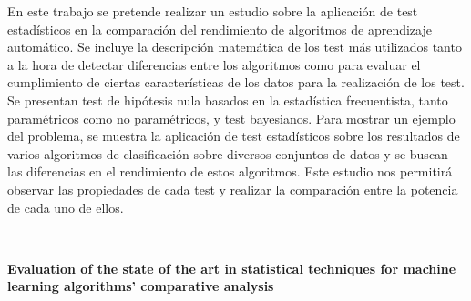 \chapter*{}





\cleardoublepage
\thispagestyle{empty}

\begin{center}
{\large\bfseries \myTitle }\\
\end{center}
\begin{center}	
	\myName \\
\end{center}


\vspace{0.7cm}
\\

	En este trabajo se pretende realizar un estudio sobre
	la aplicación de test estadísticos en la comparación
	del rendimiento de algoritmos de aprendizaje automático.
	Se incluye la descripción matemática de los test más
	utilizados tanto a la hora de detectar diferencias 
	entre los algoritmos como para evaluar el cumplimiento
	de ciertas características de los datos para la
	realización de los test. Se presentan test de 
	hipótesis nula basados en la estadística frecuentista,
	tanto paramétricos como no paramétricos, y test
	bayesianos. Para mostrar un ejemplo del problema, se 
	muestra la aplicación de test estadísticos sobre
	los resultados de varios algoritmos de clasificación
	sobre diversos conjuntos de datos y se buscan las 
	diferencias en el rendimiento de estos algoritmos.
	Este estudio nos permitirá observar las propiedades
	de cada test y realizar la comparación entre la
	potencia de cada uno de ellos.
	
\\
\cleardoublepage

\thispagestyle{empty}


\begin{center}
{\large\bfseries Evaluation of the state of the art in statistical
 techniques for machine learning algorithms' comparative analysis}\\
\end{center}
\begin{center}
	\myName	\\
\end{center}

